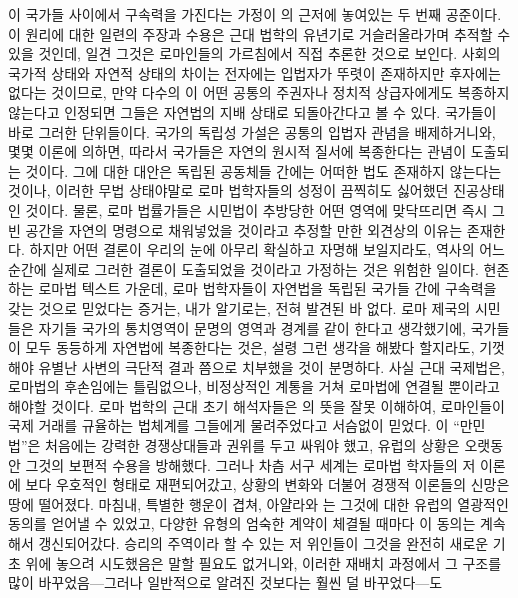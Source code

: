 이 국가들 사이에서 구속력을 가진다는 가정이
의 근저에 놓여있는 두 번째 공준이다.
이 원리에 대한 일련의 주장과 수용은 근대 법학의 유년기로 거슬러올라가며
추적할 수 있을 것인데,
일견 그것은 로마인들의 가르침에서 직접 추론한 것으로 보인다.
사회의 국가적 상태와 자연적 상태의 차이는
전자에는 입법자가 뚜렷이 존재하지만 후자에는 없다는 것이므로,
만약 다수의 이
어떤 공통의 주권자나 정치적 상급자에게도
복종하지 않는다고 인정되면 그들은 자연법의 지배 상태로 되돌아간다고 볼 수 있다.
국가들이 바로 그러한 단위들이다.
국가의 독립성 가설은 공통의 입법자 관념을 배제하거니와,
몇몇 이론에 의하면,
따라서 국가들은 자연의 원시적 질서에 복종한다는 관념이 도출되는 것이다.
그에 대한 대안은 독립된 공동체들 간에는 어떠한 법도 존재하지 않는다는 것이나,
이러한 무법 상태야말로
로마 법학자들의 성정이 끔찍히도 싫어했던 진공상태인 것이다.
물론, 로마 법률가들은 시민법이 추방당한 어떤 영역에 맞닥뜨리면
즉시 그 빈 공간을 자연의 명령으로 채워넣었을 것이라고 추정할 만한
외견상의 이유는 존재한다.
하지만 어떤 결론이 우리의 눈에 아무리 확실하고 자명해 보일지라도,
역사의 어느 순간에
실제로 그러한 결론이 도출되었을 것이라고 가정하는 것은 위험한 일이다.
현존하는 로마법 텍스트 가운데,
로마 법학자들이 자연법을 독립된 국가들 간에 구속력을 갖는 것으로
믿었다는 증거는, 내가 알기로는, 전혀 발견된 바 없다.
로마 제국의 시민들은
자기들 국가의 통치영역이 문명의 영역과 경계를 같이 한다고 생각했기에,
국가들이 모두 동등하게 자연법에 복종한다는 것은,
설령 그런 생각을 해봤다 할지라도,
기껏해야 유별난 사변의 극단적 결과 쯤으로 치부했을 것이 분명하다.
사실 근대 국제법은,
로마법의 후손임에는 틀림없으나,
비정상적인 계통을 거쳐 로마법에 연결될 뿐이라고 해야할 것이다.
로마 법학의 근대 초기 해석자들은
의 뜻을 잘못 이해하여,
로마인들이 국제 거래를 규율하는 법체계를 그들에게 물려주었다고
서슴없이 믿었다.
이 ``만민법''은 처음에는 강력한 경쟁상대들과
권위를 두고 싸워야 했고,
유럽의 상황은 오랫동안 그것의 보편적 수용을 방해했다.
그러나 차츰 서구 세계는 로마법 학자들의 저 이론에
보다 우호적인 형태로 재편되어갔고,
상황의 변화와 더불어 경쟁적 이론들의 신망은 땅에 떨어졌다.
마침내, 특별한 행운이 겹쳐,
아얄라와 는 그것에 대한 유럽의 열광적인 동의를
얻어낼 수 있었고, 다양한 유형의 엄숙한 계약이 체결될 때마다 이 동의는
계속해서 갱신되어갔다.
승리의 주역이라 할 수 있는 저 위인들이
그것을 완전히 새로운 기초 위에 놓으려 시도했음은 말할 필요도 없거니와,
이러한 재배치 과정에서 그 구조를
많이 바꾸었음---그러나 일반적으로 알려진 것보다는 훨씬 덜 바꾸었다---도

